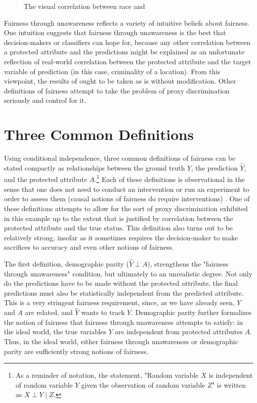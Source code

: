 \begin{figure}[bth]
    \caption{The visual correlation between race and \pp}
    \label{fig:heatmaps_correlation}
\end{figure}
Fairness through unawareness reflects a variety of intuitive beliefs about fairness. One intuition suggests that fairness through unawareness is the best that decision-makers or classifiers can hope for, because any other correlation between a protected attribute and the predictions might be explained as an unfortunate reflection of real-world correlation between the protected attribute and the target variable of prediction (in this case, criminality of a location). From this viewpoint, the results of \pp ought to be taken as is without modification. Other definitions of fairness attempt to take the problem of proxy discrimination seriously and control for it.

\section{Three Common Definitions}

Using conditional independence, three common definitions of fairness can be stated compactly as relationships between the ground truth $Y$, the prediction $\hat{Y}$, and the protected attribute $A$.\footnote{As a reminder of notation, the statement, "Random variable $X$ is independent of random variable $Y$ given the observation of random variable $Z$" is written as $X \perp Y \mid Z$.} Each of these definitions is observational in the sense that one does not need to conduct an intervention or run an experiment to order to assess them (causal notions of fairness do require interventions) \citep{hardt_equality_2016}. One of these definitions attempts to allow for the sort of proxy discrimination exhibited in this example up to the extent that is justified by correlation between the protected attribute and the true status. This definition also turns out to be relatively strong, insofar as it sometimes requires the decision-maker to make sacrifices to accuracy and even other notions of fairness.

The first definition, demographic parity ($\hat{Y} \perp A$), strengthens the "fairness through unawareness" condition, but ultimately to an unrealistic degree. Not only do the predictions have to be made without the protected attribute, the final predictions must also be statistically independent from the predicted attribute. This is a very stringent fairness requirement, since, as we have already seen, $Y$ and $A$ are related, and $\hat{Y}$ wants to track $Y$. Demographic parity further formalizes the notion of fairness that fairness through unawareness attempts to satisfy: in the ideal world, the true variables $Y$ are independent from protected attributes $A$. Thus, in the ideal world, either fairness through unawareness or demographic parity are sufficiently strong notions of fairness.

